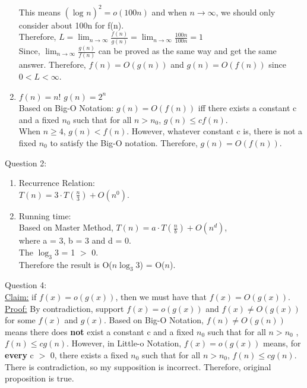 \documentclass[12pt]{article}
\begin{document}
\begin{enumerate}[label=(\alph*)]
    This means $(\log_{}{n})^2 = o(100n)$ and when $n\rightarrow\infty$, we should only consider about 100n for f(n). \vspace{1mm} \\
    Therefore, $L = \lim_{n\to\infty} \frac{f(n)}{g(n)} = \lim_{n\to\infty} \frac{100n}{100n} = 1  $\vspace{2mm} \vspace{1mm} \\
    Since, $\lim_{n\to\infty} \frac{g(n)}{f(n)}$ can be proved as the same way and get the same answer. Therefore, $f(n) = O(g(n)) $ and $g(n) = O(f(n)) $ since $0 < L < \infty$.
  \item $f(n) = n!$ \hspace{1cm} $g(n) = 2^n$ \vspace{1mm} \\
    Based on Big-O Notation: $g(n) = O(f(n))$ iff there exists a constant c and a fixed $n_0$ such that for all $n > n_0$, $g(n) \leq cf(n)$. \vspace{1mm} \\
    When $n \geq 4$, $g(n) < f(n)$. However, whatever constant c is, there is not a fixed $n_0$ to satisfy the Big-O notation. Therefore, $g(n) = O(f(n))$.
\end{enumerate}


\pagebreak
\large Question 2:\\
\normalsize 
\begin{enumerate}
\item Recurrence Relation: \\
$T(n) = 3 \cdot T(\frac{n}{3}) + O(n^0)$.
\item Running time:\\
Based on Master Method, $T(n) = a \cdot T(\frac{n}{b}) + O(n^d)$,\\
where a = 3, b = 3 and d = 0.\\
The ${\log_3 3}$ = 1 $>$ 0. \\
Therefore the result is O($n{\log_3 3}$) = O($n$).
\end{enumerate}



\pagebreak
\large Question 4: \vspace{5mm}\\
\normalsize 
\underline{Claim:} if $f(x) = o(g(x))$, then we must have that $f(x) = O(g(x))$. \vspace{2mm}\\
\underline{Proof:} By contradiction, support $f(x) = o(g(x))$ and $f(x) \neq O(g(x))$ for some $f(x)$ and $g(x)$. Based on Big-O Notation, $f(n) \neq O(g(n))$ means there does \textbf{not} exist a constant c and a fixed $n_0$ such that for all $n > n_0$ , $f(n) \leq cg(n)$. However, in Little-o Notation, $f(x) = o(g(x))$ means, for \textbf{every} c $>$ 0, there exists a fixed $n_0$ such that for all $n > n_0$, $f(n) \leq cg(n)$. There is contradiction, so my supposition is incorrect. Therefore, original proposition is true.
\end{document}
